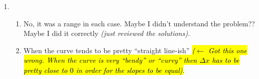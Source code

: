 \documentclass[]{article}
\DeclareRobustCommand{\hlred}[1]{{\sethlcolor{red}\hl{#1}}}
\begin{document}
\begin{enumerate}
	\item \begin{enumerate}
		\item No, it was a range in each case. Maybe I didn't understand the problem?? Maybe I did it correctly \textit{(just reviewed the solutions)}.
		\item When the curve tends to be pretty ``straight line-ish'' \hlred{\textit{($\leftarrow$ Got this one wrong. When the curve is very ``bendy'' or ``curvy'' then $\Delta x$ has to be pretty close to $0$ in order for the slopes to be equal)}}.
	\end{enumerate}

\end{enumerate}
\end{document}
